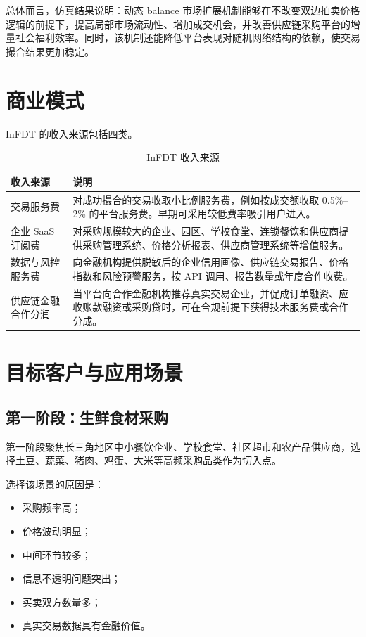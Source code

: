\documentclass[UTF8,11pt]{ctexart}
\begin{document}
总体而言，仿真结果说明：动态 balance 市场扩展机制能够在不改变双边拍卖价格逻辑的前提下，提高局部市场流动性、增加成交机会，并改善供应链采购平台的增量社会福利效率。同时，该机制还能降低平台表现对随机网络结构的依赖，使交易撮合结果更加稳定。
\section{商业模式}

InFDT 的收入来源包括四类。

\begin{table}[h]
    \centering
    \caption{InFDT 收入来源}
    \begin{tabularx}{\textwidth}{p{3.2cm}Y}
        \toprule
        收入来源        & 说明                                                           \\
        \midrule
        交易服务费       & 对成功撮合的交易收取小比例服务费，例如按成交额收取 0.5\%--2\% 的平台服务费。早期可采用较低费率吸引用户进入。 \\
        企业 SaaS 订阅费 & 对采购规模较大的企业、园区、学校食堂、连锁餐饮和供应商提供采购管理系统、价格分析报表、供应商管理系统等增值服务。     \\
        数据与风控服务费    & 向金融机构提供脱敏后的企业信用画像、供应链交易报告、价格指数和风险预警服务，按 API 调用、报告数量或年度合作收费。  \\
        供应链金融合作分润   & 当平台向合作金融机构推荐真实交易企业，并促成订单融资、应收账款融资或采购贷时，可在合规前提下获得技术服务费或合作分成。  \\
        \bottomrule
    \end{tabularx}
\end{table}

\section{目标客户与应用场景}

\subsection{第一阶段：生鲜食材采购}

第一阶段聚焦长三角地区中小餐饮企业、学校食堂、社区超市和农产品供应商，选择土豆、蔬菜、猪肉、鸡蛋、大米等高频采购品类作为切入点。

选择该场景的原因是：

\vspace{-0.5em}
\begin{multicols}{2}
    \begin{itemize}
        \item 采购频率高；
        \item 价格波动明显；
        \item 中间环节较多；
        \item 信息不透明问题突出；
        \item 买卖双方数量多；
        \item 真实交易数据具有金融价值。
    \end{itemize}
\end{multicols}
\end{document}
